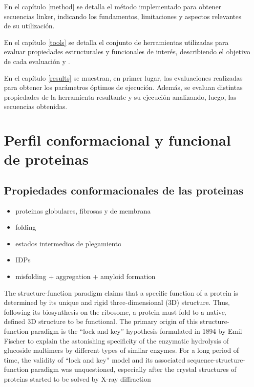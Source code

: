 En el capítulo \ref{method} se detalla el método implementado para obtener secuencias linker, indicando los fundamentos, limitaciones y aspectos relevantes de su utilización.

En el capítulo \ref{tools} se detalla el conjunto de herramientas utilizadas para evaluar propiedades estructurales y funcionales de interés, describiendo el objetivo de cada evaluación y . 

En el capítulo \ref{results} se muestran, en primer lugar, las evaluaciones realizadas para obtener los parámetros óptimos de ejecución. 
Además, se evaluan distintas propiedades de la herramienta resultante y su ejecución analizando, luego, las secuencias obtenidas. 


\section{Perfil conformacional y funcional de proteinas}
\label{proteinLandscape}

\subsection{Propiedades conformacionales de las proteinas}
\label{conformationalLandscape}

\begin{itemize}
 \item proteinas globulares, fibrosas y de membrana
 \item folding
 \item estados intermedios de plegamiento
 \item IDPs
 \item misfolding + aggregation + amyloid formation
\end{itemize}







The structure-function paradigm claims that a specific function of a protein is determined by its unique and rigid three-dimensional (3D) structure. 
Thus, following its biosynthesis on the ribosome, a protein must fold to a native, defined 3D structure to be functional. 
The primary origin of this structure-function paradigm is the “lock and key” hypothesis formulated in 1894 by Emil Fischer to explain the astonishing specificity of the enzymatic hydrolysis of glucoside multimers by different types
of similar enzymes. For a long period of time, the validity of “lock and key” model and its associated sequence-structure-function paradigm was unquestioned, especially after the crystal structures of proteins started to be solved by X-ray diffraction

